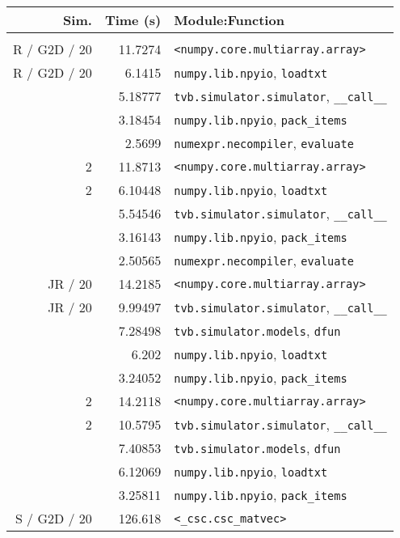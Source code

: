 \begin{table}
{\footnotesize \begin{tabular}{r | r | l }
Sim. &        Time (s) &                     Module:Function \\
\hline \\
R / G2D / 20  &         11.7274 & \texttt{<numpy.core.multiarray.array>} \\
R / G2D / 20  &          6.1415 & \texttt{numpy.lib.npyio}, \texttt{loadtxt} \\
 &         5.18777 & \texttt{tvb.simulator.simulator}, \texttt{\_\_call\_\_} \\
 &         3.18454 & \texttt{numpy.lib.npyio}, \texttt{pack\_items} \\
 &          2.5699 & \texttt{numexpr.necompiler}, \texttt{evaluate} \\
\hline
2 &         11.8713 & \texttt{<numpy.core.multiarray.array>} \\
2 &         6.10448 & \texttt{numpy.lib.npyio}, \texttt{loadtxt} \\
 &         5.54546 & \texttt{tvb.simulator.simulator}, \texttt{\_\_call\_\_} \\
 &         3.16143 & \texttt{numpy.lib.npyio}, \texttt{pack\_items} \\
 &         2.50565 & \texttt{numexpr.necompiler}, \texttt{evaluate} \\
\hline
 JR / 20  &         14.2185 & \texttt{<numpy.core.multiarray.array>} \\
 JR / 20  &         9.99497 & \texttt{tvb.simulator.simulator}, \texttt{\_\_call\_\_} \\
 &         7.28498 & \texttt{tvb.simulator.models}, \texttt{dfun} \\
 &           6.202 & \texttt{numpy.lib.npyio}, \texttt{loadtxt} \\
 &         3.24052 & \texttt{numpy.lib.npyio}, \texttt{pack\_items} \\
\hline
2 &         14.2118 & \texttt{<numpy.core.multiarray.array>} \\
2 &         10.5795 & \texttt{tvb.simulator.simulator}, \texttt{\_\_call\_\_} \\
 &         7.40853 & \texttt{tvb.simulator.models}, \texttt{dfun} \\
 &         6.12069 & \texttt{numpy.lib.npyio}, \texttt{loadtxt} \\
 &         3.25811 & \texttt{numpy.lib.npyio}, \texttt{pack\_items} \\
\hline
S / G2D / 20 &         126.618 & \texttt{<\_csc.csc\_matvec>} \\

\end{tabular}}
\end{table}
